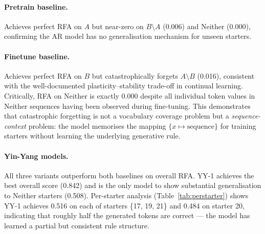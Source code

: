 \documentclass[10pt,twocolumn]{article}
\begin{document}
\begin{table}[t]
\centering
\caption{Rule-following accuracy (mean over starters in each split). \textbf{Bold} indicates best among Yin-Yang variants.}
\label{tab:main}
\end{table}

\paragraph{Pretrain baseline.}
Achieves perfect RFA on $A$ but near-zero on $B \setminus A$ (0.006) and Neither (0.000), confirming the AR model has no generalisation mechanism for unseen starters.

\paragraph{Finetune baseline.}
Achieves perfect RFA on $B$ but catastrophically forgets $A \setminus B$ (0.016), consistent with the well-documented plasticity--stability trade-off in continual learning. Critically, RFA on Neither is exactly 0.000 despite all individual token values in Neither sequences having been observed during fine-tuning. This demonstrates that catastrophic forgetting is not a vocabulary coverage problem but a \emph{sequence-context} problem: the model memorises the mapping $\{x \mapsto \text{sequence}\}$ for training starters without learning the underlying generative rule.

\paragraph{Yin-Yang models.}
All three variants outperform both baselines on overall RFA. YY-1 achieves the best overall score (0.842) and is the only model to show substantial generalisation to Neither starters (0.508). Per-starter analysis (Table~\ref{tab:perstarter}) shows YY-1 achieves 0.516 on each of starters \{17, 19, 21\} and 0.484 on starter 20, indicating that roughly half the generated tokens are correct — the model has learned a partial but consistent rule structure.
\end{document}
